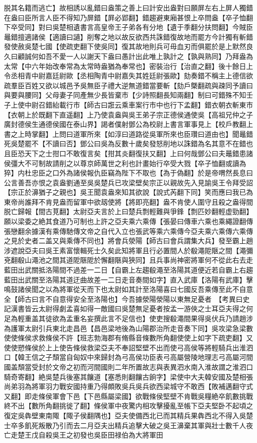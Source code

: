 脱其名籍而逃亡】故相誘以亂錯曰盎策之善上曰計安出盎對曰願屏左右上屏人獨錯在盎曰臣所言人臣不得知乃屏錯【屛必郢翻】錯趨避東廂甚恨上卒問盎【卒子恤翻下卒受同】對曰吳楚相遺書言高皇帝王子弟各有分地【遺于季翻分扶問翻】今賊臣鼂錯擅適諸侯【適讀曰讁】削奪之地以故反欲西共誅錯復故地而罷方今計獨有斬錯發使赦吳楚七國【使疏吏翻下使吳同】復其故地則兵可毋血刃而俱罷於是上默然良久曰顧誠何如吾不愛一人以謝天下盎曰愚計出此唯上孰計之【孰與熟同】乃拜盎為太常【中六年始改奉常為太常時盎猶為奉常也】密裝治行【治直之翻】後十餘日上令丞相青中尉嘉廷尉歐【丞相陶青中尉嘉失其姓廷尉張歐】劾奏錯不稱主上德信欲疏羣臣百姓又欲以城邑予吳無臣子禮大逆無道錯當要斬【劾戶槩翻疏與疎同予讀曰與要與腰同】父母妻子同產無少長皆棄市【少詩照翻長知兩翻】制曰可錯殊不知壬子上使中尉召錯紿載行市【師古曰誑云乘車案行市中也行下孟翻】錯衣朝衣斬東市【衣朝上於既翻下直遥翻】上乃使袁盎與吳王弟子宗正德侯通使吳【高祖兄仲之子廣封德侯生通德侯國在泰山界】謁者僕射鄧公為校尉上書言軍事見上【校戶教翻上書之上時掌翻】上問曰道軍所來【如淳曰道路從吳軍所來也臣瓚曰道由也】聞鼂錯死吳楚罷不【不讀曰否】鄧公曰吳為反數十歲矣發怒削地以誅錯為名其意不在錯也且臣恐天下之士拑口不敢復言矣【拑其炎翻復扶又翻】上曰何哉鄧公曰夫鼂錯患諸侯彊大不可制故請削之以尊京師萬世之利也計畫始行卒受大戮【卒子恤翻或讀為猝】内杜忠臣之口外為諸侯報仇臣竊為陛下不取也【為于偽翻】於是帝喟然長息曰公言善吾亦恨之袁盎劉通至吳吳楚兵已攻梁壁矣宗正以親故先入見諭吳王令拜受詔【宗正於濞猶子之親也】吳王聞袁盎來知其欲說【說式芮翻下同】笑而應曰我已為東帝尚誰拜不肯見盎而留軍中欲刼使將【將即亮翻】盎不肯使人圍守且殺之盎得間脱亡歸報【間古莧翻】太尉亞夫言於上曰楚兵剽輕難與爭鋒【剽匹妙翻輕虚勁翻】願以梁委之絶其食道乃可制也上許之亞夫乘六乘傳【張晏曰傳車六乘也乘繩證翻傳張戀翻余據漢有乘傳馳傳文帝之自代入立也張武等乘六乘傳今亞夫乘六乘傳六乘傳之見於史者二盖又與乘傳不同也】將會兵滎陽【師古曰會兵謂集大兵】發至霸上趙涉遮說亞夫曰吳王素富懷輯死士久矣此知將軍且行必置間人於殽澠阸陿之間【澠彌兗翻殽山澠池之間其道阸陿阸於懈翻陿與狹同】且兵事尚神密將軍何不從此右去走藍田出武關抵洛陽間不過差一二日【自霸上左趨殽澠至洛陽其道便近若自霸上右趨藍田出武關至洛陽其道迂曲故差一二日走音奏間如字】直入武庫【洛陽有武庫】擊鳴鼓諸侯聞之以為將軍從天而下也太尉如其計至洛陽喜曰七國反吾乘傳至此不自意全【師古曰言不自意得安全至洛陽也】今吾據滎陽滎陽以東無足憂者　【考異曰史記漢書皆云太尉得劇孟喜如得一敵國曰吳楚無足憂者按孟一游俠之士耳亞夫得之何足為輕重盖其徒欲為孟重名妄撰此言不足信也】使吏搜殽澠間果得吳伏兵乃請趙涉為護軍太尉引兵東北走昌邑【昌邑梁地後為山陽郡治所走音奏下同】吳攻梁急梁數使使條侯求救條侯不許【班志勃海郡有脩縣音條數所角翻使使上如字下疏吏翻】又使使愬條侯於上上使告條侯救梁亞夫不奉詔堅壁不出而使弓高侯等將輕騎兵出淮泗口【韓王信之子頹當自匈奴中來歸封為弓高侯功臣表弓高屬營陵地理志弓高屬河間國盖頹當受封於文帝之初而河間國則二年所置故志與表異泗水南入淮故謂之淮泗口騎奇寄翻】絶吳楚兵後塞其饟道【塞悉則翻饟古餉字】梁使中大夫韓安國及楚相張尚弟羽為將軍羽力戰安國持重乃得頗敗吳兵吳兵欲西梁城守不敢西【敗補邁翻守式又翻】即走條侯軍會下邑【下邑縣屬梁國】欲戰條侯堅壁不肯戰吳糧絶卒飢數挑戰終不出【數所角翻挑徙了翻】條侯軍中夜驚内相攻擊擾亂至帳下亞夫堅卧不起頃之復定吳犇壁東南陬【陬子侯翻隅也】亞夫使備西北已而其精兵果犇西北不得入吳楚士卒多飢死叛散乃引而去二月亞夫出精兵追擊大破之吳王濞棄其軍與壯士數千人夜亡走楚王戊自殺吳王之初發也吳臣田禄伯為大將軍田
